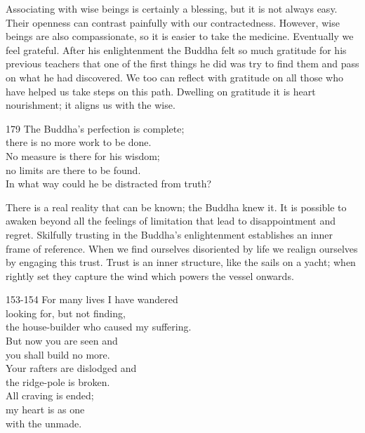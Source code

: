 \begin{dhpRefl}

Associating with wise beings is certainly a blessing, but it is not
always easy. Their openness can contrast painfully with our
contractedness. However, wise beings are also compassionate, so it is
easier to take the medicine. Eventually we feel grateful. After his
enlightenment the Buddha felt so much gratitude for his previous
teachers that one of the first things he did was try to find them and
pass on what he had discovered. We too can reflect with gratitude on
all those who have helped us take steps on this path. Dwelling on
gratitude it is heart nourishment; it aligns us with the wise.

\end{dhpRefl}


\begin{dhpVerse}{179}
\label{dhp-179}
The Buddha's perfection is complete;\\
there is no more work to be done.\\
No measure is there for his wisdom;\\
no limits are there to be found.\\
In what way could he be distracted from truth?
\end{dhpVerse}

\begin{dhpRefl}

There is a real reality that can be known; the Buddha knew it. It is
possible to awaken beyond all the feelings of limitation that lead to
disappointment and regret. Skilfully trusting in the Buddha's
enlightenment establishes an inner frame of reference. When we find
ourselves disoriented by life we realign ourselves by engaging this
trust. Trust is an inner structure, like the sails on a yacht; when
rightly set they capture the wind which powers the vessel onwards.

\end{dhpRefl}


\begin{dhpVerse}{153-154}
\label{dhp-153}\label{dhp-154}
For many lives I have wandered\\
looking for, but not finding,\\
the house-builder who caused my suffering.\\
But now you are seen and\\
you shall build no more.\\
Your rafters are dislodged and\\
the ridge-pole is broken.\\
All craving is ended;\\
my heart is as one\\
with the unmade.
\end{dhpVerse}

